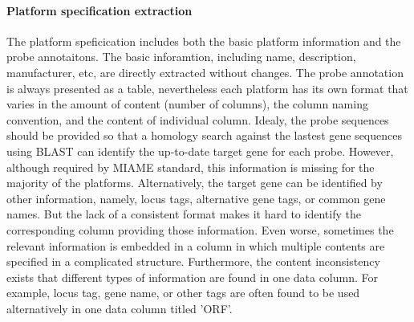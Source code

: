 \paragraph{Platform specification extraction}
%
The platform speficication includes both the basic platform information and
the probe annotaitons.
%
The basic inforamtion, including name, description, manufacturer, etc, are
directly extracted without changes.
%
The probe annotation is always presented as a table, nevertheless each platform
has its own format that varies in the amount of content (number of columns),
the column naming convention, and the content of individual column.
%
Idealy, the probe sequences should be provided so that a homology search
against the lastest gene sequences using BLAST \cite{Altschul1997} can identify
the up-to-date target gene for each probe.
%
However, although required by MIAME\cite{Brazma2001} standard, this information
is missing for the majority of the platforms.
%
Alternatively, the target gene can be identified by other information, namely,
locus tags, alternative gene tags, or common gene names.
%
But the lack of a consistent format makes it hard to identify the corresponding
column providing those information.
%
Even worse, sometimes the relevant information is embedded in a column in which
multiple contents are specified in a complicated structure.
%
Furthermore, the content inconsistency exists that different types of
information are found in one data column.
%
For example, locus tag, gene name, or other tags are often found to be used
alternatively in one data column titled 'ORF'.



